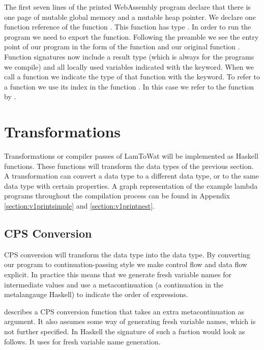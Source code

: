 {The first seven lines of the printed WebAssembly program declare that there is one page of mutable global memory and a mutable heap pointer. We declare one function reference of the function . This function has type . In order to run the program we need to export the  function. Following the preamble we see the entry point of our program in the form of the function  and our original function . Function signatures now include a result type (which is always  for the programs we compile) and all locally used variables indicated with the  keyword. When we call a function we indicate the type of that function with the  keyword. To refer to a function we use its index in the function . In this case we refer to the function  by .

\section{\label{section:transforms}Transformations}
Transformations or compiler passes of LamToWat will be implemented as Haskell functions. These functions will transform the data types of the previous section. A transformation can convert a data type to a different data type, or to the same data type with certain properties. A graph representation of the example lambda programs throughout the compilation process can be found in Appendix \ref{section:v1printsimple} and \ref{section:v1printnest}.

\subsection{\label{subsection:cpsconvert}CPS Conversion}
CPS conversion will transform the  data type into the  data type. By converting our program to continuation-passing style we make control flow and data flow explicit. In practice this means that we generate fresh variable names for intermediate values and use a metacontinuation (a continuation in the metalangauge Haskell) to indicate the order of expressions.

\citeauthor{DBLP:books/daglib/0022396} describes a CPS conversion function that takes an extra metacontinuation as argument. It also assumes some way of generating fresh variable names, which is not further specified. In Haskell the signature of such a fuction would look as follows. It uses  for fresh variable name generation.

}

